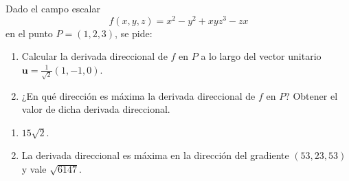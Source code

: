 {Dado el campo escalar 
\[
f(x,y,z) = x^2-y^2+xyz^3-zx
\]
en el punto $P=(1,2,3)$, se pide:
\begin{enumerate}
\item Calcular la derivada direccional de $f$ en $P$ a lo largo del vector unitario $\mathbf{u}=\frac{1}{\sqrt2}(1,-1,0)$.
\item ¿En qué dirección es máxima la derivada direccional de $f$ en $P$? Obtener el valor de dicha derivada direccional.
\end{enumerate} 
}
{\begin{enumerate}
\item $15\sqrt{2}$.
\item La derivada direccional es máxima en la dirección del gradiente $(53,23,53)$ y vale $\sqrt{6147}$.
\end{enumerate}
}
{
}

